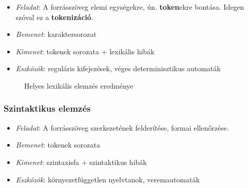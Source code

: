 \begin{itemize}
	\item \textit{Feladat}: A forrásszöveg elemi egységekre, ún. \textbf{token}ekre bontása. Idegen szóval ez a \textbf{tokenizáció}.
	\item \textit{Bemenet}: karaktersorozat
	\item \textit{Kimenet}: tokenek sorozata + lexikális hibák
	\item \textit{Eszközök}: reguláris kifejezések, véges determinisztikus automaták
\end{itemize}

\begin{figure}[h!]
	\centering
	\caption{Helyes lexikális elemzés eredménye}
\end{figure}


\subsubsection{Szintaktikus elemzés}

\begin{itemize}
	\item \textit{Feladat}: A forrásszöveg szerkezetének felderítése, formai ellenőrzése.
	\item \textit{Bemenet}: tokenek sorozata
	\item \textit{Kimenet}: szintaxisfa + szintaktikus hibák
	\item \textit{Eszközök}: környezetfüggetlen nyelvtanok, veremautomaták
\end{itemize}

